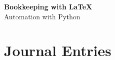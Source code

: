 \documentclass[a4paper, 10pt]{article}
\begin{document}
	
	\begin{center}
		{\bfseries\LARGE Bookkeeping with \LaTeX{}} \\ \medskip
		{\LARGE Automation with Python}
	\end{center}
	
	\section{Journal Entries}
	
	
\end{document}
